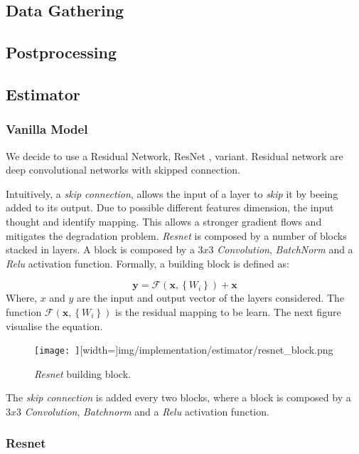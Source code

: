 \documentclass[../document.tex]{subfiles}
\begin{document}
\subsection{Data Gathering}
\subsection{Postprocessing}
\subsection{Estimator}

\subsubsection{Vanilla Model}
We decide to use a Residual Network, ResNet \cite{he2015deep}, variant. Residual network are deep convolutional
networks with skipped connection. 

Intuitively, a \emph{skip connection}, allows the input 
of a layer to \emph{skip} it by beeing added to its output. Due to possible different features dimension, the input thought and identify mapping. This allows a stronger gradient flows and mitigates the degradation problem. \emph{Resnet} is composed by a number of blocks stacked in layers. A block is composed by a $3x3$ \emph{Convolution}, \emph{BatchNorm} \cite{ioffe2015batch} and a \emph{Relu} activation function. Formally, a building block is defined as: 

\begin{equation}
	\mathbf{y}=\mathcal{F}\left(\mathbf{x},\left\{W_{i}\right\}\right)+\mathbf{x}
	\label{eq : resnet}
\end{equation}
Where, $x$ and $y$ are the input and output vector of the layers considered. The function $\mathcal{F}\left(\mathbf{x},\left\{W_{i}\right\}\right)$ is the residual mapping to be learn. The next figure visualise the equation.

\begin{figure}[H]
\centering
\texttt{[image: ]}[width=\linewidth]{img/implementation/estimator/resnet_block.png}
\caption{\emph{Resnet} building block.}
\end{figure}
The \emph{skip connection} is added every two blocks, where a block is composed by a $3x3$ \emph{Convolution}, \emph{Batchnorm} and a \emph{Relu} activation function. 
\subsubsection{Resnet}
\end{document}

